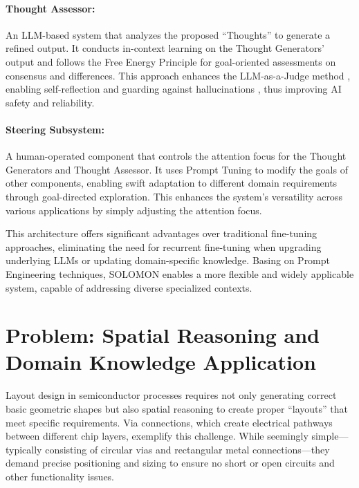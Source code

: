 \documentclass{article}
\begin{document}
\paragraph{Thought Assessor:} An LLM-based system that analyzes the proposed ``Thoughts'' to generate a refined output. It conducts in-context learning on the Thought Generators' output and follows the Free Energy Principle for goal-oriented assessments on consensus and differences. This approach enhances the LLM-as-a-Judge method \cite{zheng2023judgingllmasajudgemtbenchchatbot, lin2023llmevalunifiedmultidimensionalautomatic}, enabling self-reflection \cite{ji2023mitigatinghallucinationlargelanguage} and guarding against hallucinations \cite{guerreiro2023lookingneedlehaystackcomprehensive}, thus improving AI safety and reliability.

\paragraph{Steering Subsystem:} A human-operated component that controls the attention focus for the Thought Generators and Thought Assessor. It uses Prompt Tuning to modify the goals of other components, enabling swift adaptation to different domain requirements through goal-directed exploration. This enhances the system's versatility across various applications by simply adjusting the attention focus.

This architecture offers significant advantages over traditional fine-tuning approaches, eliminating the need for recurrent fine-tuning when upgrading underlying LLMs or updating domain-specific knowledge. Basing on Prompt Engineering techniques, SOLOMON enables a more flexible and widely applicable system, capable of addressing diverse specialized contexts.

\section{Problem: Spatial Reasoning and Domain Knowledge Application}
\label{sec:problem}
Layout design in semiconductor processes requires not only generating correct basic geometric shapes but also spatial reasoning to create proper ``layouts'' that meet specific requirements. Via connections, which create electrical pathways between different chip layers, exemplify this challenge. While seemingly simple—typically consisting of circular vias and rectangular metal connections—they demand precise positioning and sizing to ensure no short or open circuits and other functionality issues.
\end{document}

